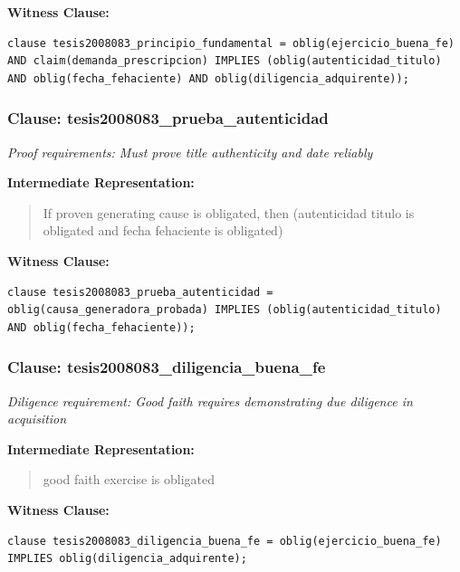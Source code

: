 \documentclass[11pt,a4paper]{article}
\begin{document}
\textbf{Witness Clause:}

\begin{lstlisting}[style=witnessstyle, language=Witness]
clause tesis2008083_principio_fundamental = oblig(ejercicio_buena_fe) AND claim(demanda_prescripcion) IMPLIES (oblig(autenticidad_titulo) AND oblig(fecha_fehaciente) AND oblig(diligencia_adquirente));
\end{lstlisting}

\subsubsection{Clause: tesis2008083\_prueba\_autenticidad}

\textit{Proof requirements: Must prove title authenticity and date reliably}

\textbf{Intermediate Representation:}

\begin{quote}
If proven generating cause is obligated, then (autenticidad titulo is obligated and fecha fehaciente is obligated)
\end{quote}

\textbf{Witness Clause:}

\begin{lstlisting}[style=witnessstyle, language=Witness]
clause tesis2008083_prueba_autenticidad = oblig(causa_generadora_probada) IMPLIES (oblig(autenticidad_titulo) AND oblig(fecha_fehaciente));
\end{lstlisting}

\subsubsection{Clause: tesis2008083\_diligencia\_buena\_fe}

\textit{Diligence requirement: Good faith requires demonstrating due diligence in acquisition}

\textbf{Intermediate Representation:}

\begin{quote}
good faith exercise is obligated
\end{quote}

\textbf{Witness Clause:}

\begin{lstlisting}[style=witnessstyle, language=Witness]
clause tesis2008083_diligencia_buena_fe = oblig(ejercicio_buena_fe) IMPLIES oblig(diligencia_adquirente);
\end{lstlisting}
\end{document}
